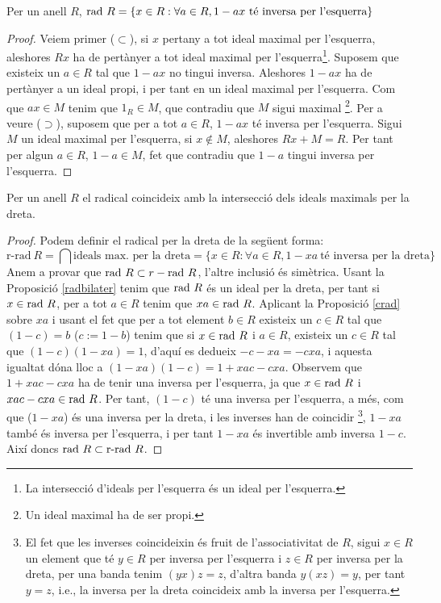 \begin{prop}\label{crad}
Per un anell $R$, $\rad R = \{ x\in R : \forall a \in R, 1-ax \ \text{té inversa per l'esquerra} \}$
\end{prop}
\begin{proof}
Veiem primer ($\subset$), si $x$ pertany a tot ideal maximal per l'esquerra, aleshores $Rx$ ha de pertànyer a tot ideal maximal per l'esquerra\footnote{La intersecció d'ideals per l'esquerra és un ideal per l'esquerra.}. Suposem que existeix un $a\in R$ tal que $1-ax$ no tingui inversa. Aleshores $1-ax$ ha de pertànyer a un ideal propi, i per tant en un ideal maximal per l'esquerra. Com que $ax\in M$ tenim que $1_R \in M$, que contradiu que $M$ sigui maximal \footnote{Un ideal maximal ha de ser propi.}.
Per a veure ($\supset$), suposem que per a tot $a\in R$, $1-ax$ té inversa per l'esquerra. Sigui $M$ un ideal maximal per l'esquerra, si $x\not \in M$, aleshores $Rx+M = R$. Per tant per algun $a\in R$, $1-a\in M$, fet que contradiu que $1-a$ tingui inversa per l'esquerra.
\end{proof}

\begin{prop}
Per un anell $R$ el radical coincideix amb la intersecció dels ideals maximals per la dreta.
\end{prop}
\begin{proof}
Podem definir el radical per la dreta de la següent forma:
$$
\text{r-rad} \ R = \bigcap \text{ideals max. per la dreta} = \{x\in R: \forall a\in R, 1-xa \ \text{té inversa per la dreta}\}
$$
Anem a provar que $\mathrm{rad} \  R\subset r-\mathrm{rad} \  R$, l'altre inclusió és simètrica.
Usant la Proposició \ref{radbilater} tenim que $\mathrm{rad} \  R$ és un ideal per la dreta, per tant si $x\in \mathrm{rad} \  R$, per a tot $a\in R$ tenim que $xa\in \mathrm{rad} \  R$. Aplicant la Proposició \ref{crad} sobre $xa$ i usant el fet que per a tot element $b\in R$ existeix un $c\in R$ tal que $(1-c)=b$ ($c:=1-b$) tenim que si $x\in \mathrm{rad} \  R$ i $a\in R$, existeix un $c\in R$ tal que $(1-c)(1-xa)=1$, d'aquí es dedueix $-c-xa=-cxa$, i aquesta igualtat dóna lloc a $(1-xa)(1-c)=1+xac-cxa$. Observem que $1+xac-cxa$ ha de tenir una inversa per l'esquerra, ja que $x\in \mathrm{rad} \  R$ i $xac-cxa\in \mathrm{rad} \  R$. Per tant, $(1-c)$ té una inversa per l'esquerra, a més, com que ($1-xa$) és una inversa per la dreta, i les inverses han de coincidir \footnote{El fet que les inverses coincideixin és fruit de l'associativitat de $R$, sigui $x\in R$ un element que té $y\in R$ per inversa per l'esquerra i $z\in R$ per inversa per la dreta, per una banda tenim $(yx)z = z$, d'altra banda $y(xz)=y$, per tant $y=z$, i.e., la inversa per la dreta coincideix amb la inversa per l'esquerra. }, $1-xa$ també és inversa per l'esquerra, i per tant $1-xa$ és invertible amb inversa $1-c$. Així doncs $\rad R \subset \text{r-rad}\ R$. 
\end{proof}

